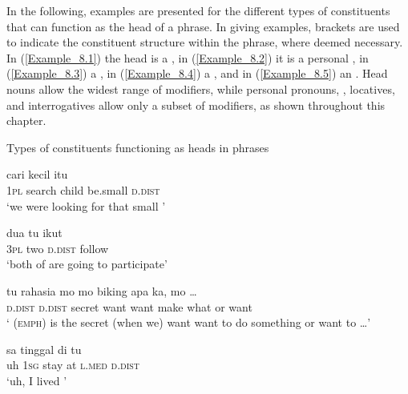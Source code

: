 In the following, examples are presented for the different types of constituents that can function as the head of a  phrase. In giving examples, brackets are used to indicate the constituent structure within the  phrase, where deemed necessary. In (\ref{Example_8.1}) the head is a , in (\ref{Example_8.2}) it is a personal , in (\ref{Example_8.3}) a , in (\ref{Example_8.4}) a , and in (\ref{Example_8.5}) an . Head nouns allow the widest range of modifiers, while personal pronouns, , locatives, and interrogatives allow only a subset of modifiers, as shown throughout this chapter.



\begin{styleExampleTitle}
Types of constituents functioning as heads in  phrases
\end{styleExampleTitle}
\ea
\label{Example_8.1}
 {cari} {} {kecil} {itu}\\ %
 \textsc{1pl}  search  child  be.small  \textsc{d.dist}\\
\glt 
‘we were looking for that small ’ \textstyleExampleSource{[080921-004a-CvNP.0070]}
\z

\ea
\label{Example_8.2}
 {dua} {tu} {ikut}\\ %
 \textsc{3pl}  two  \textsc{d.dist}  follow\\
 ‘both of \bluebold{)} are going to participate’ \textstyleExampleSource{[081115-001a-Cv.0115]}
\z

\ea
\label{Example_8.3}
 {tu} {rahasia} {mo} {mo} {biking} {apa} {ka,} {mo} {\ldots}\\ %
 \textsc{d.dist}  \textsc{d.dist}  secret  want  want  make  what  or  want  \\
 ‘ (\textsc{emph}) is the secret (when we) want want to do something or want to {\ldots}’ \textstyleExampleSource{[080917-010-CvEx.0160]}
\z

\ea
\label{Example_8.4}
 {sa} {tinggal} {di} {} {tu}\\ %
 uh  \textsc{1sg}  stay  at  \textsc{l.med}  \textsc{d.dist}\\
\glt 
‘uh, I lived \bluebold{)}’ \textstyleExampleSource{[080922-002-Cv.0112]}
\z

